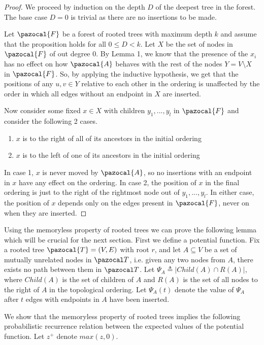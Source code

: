 \documentclass{article}
\begin{document}
\begin{proof}
We proceed by induction on the depth $D$ of the deepest tree in the forest. The base case $D=0$ is trivial as there are no insertions to be made.

Let $\pazocal{F}$ be a forest of rooted trees with maximum depth $k$ and assume that the proposition holds for all $0 \leq D < k$. Let $X$ be the set of nodes in $\pazocal{F}$ of out degree 0. By Lemma 1, we know that the presence of the $x_i$ has no effect on how $\pazocal{A}$ behaves with the rest of the nodes $Y = V \setminus X$ in $\pazocal{F}$. So, by applying the inductive hypothesis, we get that the positions of any $u,v \in Y$ relative to each other in the ordering is unaffected by the order in which all edges without an endpoint in $X$ are inserted.

Now consider some fixed $x \in X$ with children $y_1,...,y_l$ in $\pazocal{F}$ and consider the following 2 cases.

\begin{enumerate}
    \item $x$ is to the right of all of its ancestors in the initial ordering
    \item $x$ is to the left of one of its ancestors in the initial ordering
\end{enumerate}

In case 1, $x$ is never moved by $\pazocal{A}$, so no insertions with an endpoint in $x$ have any effect on the ordering. In case 2, the position of $x$ in the final ordering is just to the right of the rightmost node out of $y_1,...,y_l$. In either case, the position of $x$ depends only on the edges present in $\pazocal{F}$, never on when they are inserted.
\end{proof}

Using the memoryless property of rooted trees we can prove the following lemma which will be crucial for the next section. First we define a potential function. Fix a rooted tree $\pazocal{T} = (V,E)$ with root $r$, and let $A \subseteq V$ be a set of mutually unrelated nodes in $\pazocal T$, i.e. given any two nodes from $A$, there exists no path between them in $\pazocal T$. Let $\Psi_A \triangleq \vert Child(A) \cap R(A) \vert$, where $Child(A)$ is the set of children of $A$ and $R(A)$ is the set of all nodes to the right of $A$ in the topological ordering. Let $\Psi_A(t)$ denote the value of $\Psi_A$ after $t$ edges with endpoints in $A$ have been inserted.

We show that the memoryless property of rooted trees implies the following probabilistic recurrence relation between the expected values of the potential function. Let $z^+$ denote $max(z, 0)$.
\end{document}
